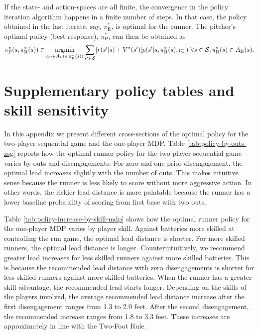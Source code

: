 \documentclass[aoas]{imsart}
\theoremstyle{plain}
\theoremstyle{definition}
\newcommand{\tablepath}{../../output/tables/}
\newcommand{\inputtable}[1]{}
\newcommand{\argmin}{\operatornamewithlimits{argmin}}
\begin{document}
       If the state- and action-spaces are all finite, the convergence in the policy iteration algorithm happens in a finite number of steps. In that case, the policy obtained in the last iterate, say, $\pi_\text{R}^*$, is optimal for the runner. The pitcher's optimal policy (best response), $\pi_\text{P}^*$, can then be obtained as 
       \[
       \pi_\text{P}^*(s,\pi_\text{R}^*(s)) \in \argmin_{a_\text{P} \in A_\text{P}(s,\pi_\text{R}^*(s))}\sum_{s' \in {\cal S}}[r(s'|s) + V^*(s')] p(s'|s,\pi_\text{R}^*(s),a_\text{P}) \ \forall s \in {\cal S}, \pi_\text{R}^*(s) \in A_\text{R}(s).
       \]


\section{Supplementary policy tables and skill sensitivity}

  In this appendix we present different cross-sections of the optimal policy for the two-player sequential game and the one-player MDP. Table \ref{tab:policy-by-outs-zsg} reports how the optimal runner policy for the two-player sequential game varies by outs and disengagements. For zero and one prior disengagement, the optimal lead increases slightly with the number of outs. This makes intuitive sense because the runner is less likely to score without more aggressive action. In other words, the riskier lead distance is more palatable because the runner has a lower baseline probability of scoring from first base with two outs.

  \begin{table}[b]
    \small
    \centering       
    \inputtable{policy_by_outs_zsg.tex}
    \caption{
      \it The optimal lead distance (in feet) by outs and prior disengagements under the two-player sequential game, assuming an average runner on first base facing an average battery (pitcher and catcher) with an 0-0 count and third base empty. Estimates include standard errors estimated via bootstrapping.
    }
    \label{tab:policy-by-outs-zsg}
  \end{table}
    
  Table \ref{tab:policy-increase-by-skill-mdp} shows how the optimal runner policy for the one-player MDP varies by player skill. Against batteries more skilled at controlling the run game, the optimal lead distance is shorter. For more skilled runners, the optimal lead distance is longer. Counterintuitively, we recommend greater lead increases for less skilled runners against more skilled batteries. This is because the recommended lead distance with zero disengagements is shorter for less skilled runners against more skilled batteries. When the runner has a greater skill advantage, the recommended lead starts longer. Depending on the skills of the players involved, the average recommended lead distance increase after the first disengagement ranges from 1.3 to 2.0 feet. After the second disengagement, the recommended increase ranges from 1.8 to 3.3 feet. These increases are approximately in line with the Two-Foot Rule.
\end{document}
